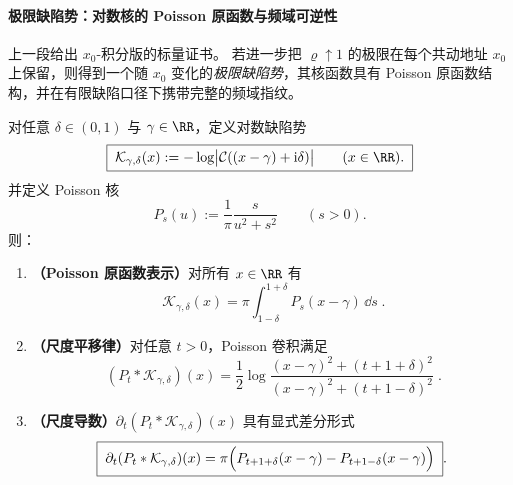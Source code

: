 \paragraph{极限缺陷势：对数核的 Poisson 原函数与频域可逆性}
上一段给出 \(x_0\)-积分版的标量证书。
若进一步把 \(\varrho\uparrow 1\) 的极限在每个共动地址 \(x_0\) 上保留，则得到一个随 \(x_0\) 变化的\emph{极限缺陷势}，其核函数具有 Poisson 原函数结构，并在有限缺陷口径下携带完整的频域指纹。

\begin{proposition}\label{prop:xi-log-defect-potential-poisson-primitive}
对任意 \(\delta\in(0,1)\) 与 \(\gamma\in\RR\)，定义对数缺陷势
\begin{equation}\label{eq:xi-log-defect-potential}
\boxed{\;
\mathcal{K}_{\gamma,\delta}(x):=-\log\bigl|\mathcal{C}((x-\gamma)+\mathrm{i}\delta)\bigr|\qquad(x\in\RR).\;}
\end{equation}
并定义 Poisson 核
\[
P_s(u):=\frac{1}{\pi}\frac{s}{u^2+s^2}\qquad(s>0).
\]
则：
\begin{enumerate}
  \item \textbf{（Poisson 原函数表示）}对所有 \(x\in\RR\) 有
  \begin{equation}\label{eq:xi-log-defect-poisson-primitive}
  \boxed{\;
  \mathcal{K}_{\gamma,\delta}(x)
  =\pi\int_{1-\delta}^{1+\delta}P_s(x-\gamma)\,\dd s\; }.
  \end{equation}
  \item \textbf{（尺度平移律）}对任意 \(t>0\)，Poisson 卷积满足
  \begin{equation}\label{eq:xi-log-defect-poisson-convolution}
  \boxed{\;
  (P_t*\mathcal{K}_{\gamma,\delta})(x)
  =\frac12\log\frac{(x-\gamma)^2+(t+1+\delta)^2}{(x-\gamma)^2+(t+1-\delta)^2}\; }.
  \end{equation}
  \item \textbf{（尺度导数）}\(\partial_t(P_t*\mathcal{K}_{\gamma,\delta})(x)\) 具有显式差分形式
  \begin{equation}\label{eq:xi-log-defect-poisson-scale-derivative}
  \boxed{\;
  \partial_t(P_t*\mathcal{K}_{\gamma,\delta})(x)
  =\pi\Bigl(P_{t+1+\delta}(x-\gamma)-P_{t+1-\delta}(x-\gamma)\Bigr)\; }.
  \end{equation}
\end{enumerate}
\end{proposition}
